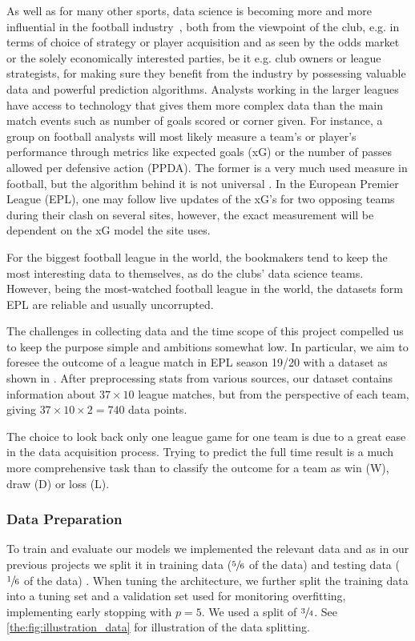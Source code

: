         As well as for many other sports, data science is becoming more and more influential in the football industry~\citep{Herbinet2018}, both from the viewpoint of the club, e.g. in terms of choice of strategy or player acquisition and as seen by the odds market or the solely economically interested parties, be it e.g. club owners or league strategists, for making sure they benefit from the industry by possessing valuable data and powerful prediction algorithms. Analysts working in the larger leagues have access to technology that gives them more complex data than the main match events such as number of goals scored or corner given. For instance, a group on football analysts will most likely measure a team's or player's performance through metrics like expected goals (xG) or the number of passes allowed per defensive action (PPDA). The former is a very much used measure in football, but the algorithm behind it is not universal . In the European Premier League (EPL), one may follow live updates of the xG's for two opposing teams during their clash on several sites, however, the exact measurement will be dependent on the xG model the site uses.
        
        For the biggest football league in the world, the bookmakers tend to keep the most interesting data to themselves, as do the clubs' data science teams. However, being the most-watched football league in the world, the datasets form EPL are reliable and usually uncorrupted. 

        The challenges in collecting data and the time scope of this project compelled us to keep the purpose simple and ambitions somewhat low. In particular, we aim to foresee the outcome of a league match in EPL season 19/20 with a dataset as shown in . After preprocessing stats from various sources, our dataset contains information about $37\times 10$ league matches, but from the perspective of each team, giving $ 37 \times 10\times 2 = 740$ data points.
        
        The choice to look back only one league game for one team is due to a great ease in the data acquisition process. Trying to predict the full time result is a much more comprehensive task than to classify the outcome for a team as win (W), draw (D) or loss (L).


    \subsubsection{Data Preparation}
        To train and evaluate our models we implemented the relevant data and as in our previous projects we split it in training data ($\sfrac{5}{6}$ of the data) and testing data ($\sfrac{1}{6}$ of the data) \citep{Project1, Project2}. When tuning the architecture, we further split the training data into a tuning set and a validation set used for monitoring overfitting, implementing early stopping with $p=5$. We used a split of $\sfrac{3}{4}$. See \cref{the:fig:illustration_data} for illustration of the data splitting. 

